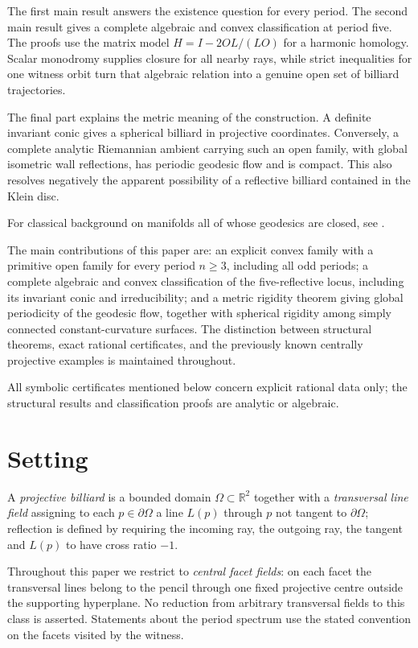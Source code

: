 \documentclass[11pt,a4paper]{article}
\theoremstyle{plain}
\theoremstyle{definition}
\theoremstyle{remark}
\begin{document}
The first main result answers the existence question for every period.  The second
main result gives a complete algebraic and convex classification at period five.
The proofs use the matrix model
\(H=I-2OL/(LO)\) for a harmonic homology.  Scalar monodromy supplies closure for
all nearby rays, while strict inequalities for one witness orbit turn that
algebraic relation into a genuine open set of billiard trajectories.

The final part explains the metric meaning of the construction.  A definite
invariant conic gives a spherical billiard in projective coordinates.  Conversely,
a complete analytic Riemannian ambient carrying such an open family, with
global isometric wall reflections, has periodic geodesic flow and is compact.  This also resolves negatively the apparent
possibility of a reflective billiard contained in the Klein disc.

For classical background on manifolds all of whose geodesics are closed, see \cite{green,besse}.

The main contributions of this paper are: an explicit convex family with a
primitive open family for every period $n\ge3$, including all odd periods; a
complete algebraic and convex classification of the five-reflective locus,
including its invariant conic and irreducibility; and a metric rigidity theorem
giving global periodicity of the geodesic flow, together with spherical
rigidity among simply connected constant-curvature surfaces.
The distinction between structural theorems, exact rational certificates, and
the previously known centrally projective examples is maintained throughout.

All symbolic certificates mentioned below concern explicit rational data only;
the structural results and classification proofs are analytic or algebraic.
\section{Setting}\label{sec:setting}

A \emph{projective billiard} \cite{tab} is a bounded domain
$\Omega\subset\mathbb{R}^2$ together with a \emph{transversal line field}
assigning to each $p\in\partial\Omega$ a line $L(p)$ through $p$ not tangent to
$\partial\Omega$; reflection is defined by requiring the incoming ray, the
outgoing ray, the tangent and $L(p)$ to have cross ratio $-1$.

Throughout this paper we restrict to \emph{central facet fields}: on each
facet the transversal lines belong to the pencil through one fixed projective
centre outside the supporting hyperplane. No reduction from arbitrary
transversal fields to this class is asserted. Statements about the period
spectrum use the stated convention on the facets visited by the witness.
\end{document}
